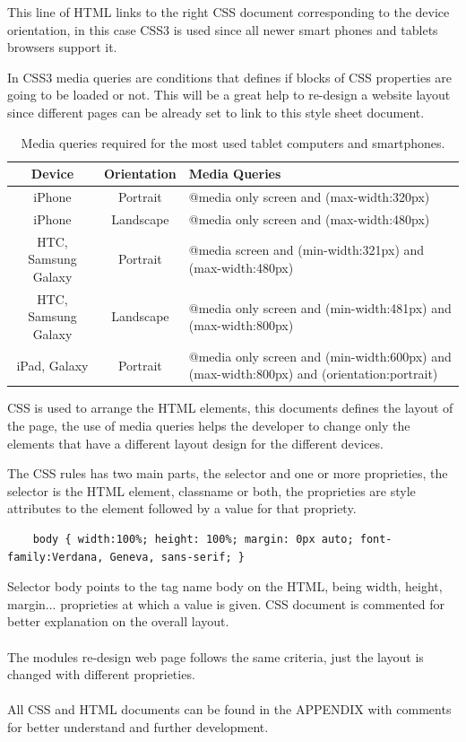 This line of HTML links to the right CSS document corresponding to the device orientation, in this case CSS3 is used since all newer smart phones and tablets browsers support it.

In CSS3 media queries are conditions that defines if blocks of CSS properties are going to be loaded or not. This will be a great help to re-design a website layout since different pages can be already set to link to this style sheet document. \\
\begin{table}[!h]
	\begin{tabular}{| c | c | p{10.5cm} |}
	\hline
	\textbf{Device} & \textbf{Orientation} & \textbf{Media Queries} \\ \hline
	iPhone & Portrait & @media only screen and (max-width:320px)\\ \hline
	iPhone & Landscape & @media only screen and (max-width:480px)\\ \hline
	HTC, Samsung Galaxy & Portrait & @media screen and (min-width:321px) and (max-width:480px)\\ \hline
	HTC, Samsung Galaxy & Landscape & @media only screen and (min-width:481px) and (max-width:800px)\\ \hline
	iPad, Galaxy & Portrait & @media only screen and (min-width:600px) and (max-width:800px) and (orientation:portrait)\\ \hline
	\end{tabular}
	\caption{Media queries required for the most used tablet computers and smartphones.}
\end{table}

CSS is used to arrange the HTML elements, this documents defines the layout of the page, the use of media queries helps the developer to change only the elements that have a different layout design for the different devices.

The CSS rules has two main parts, the selector and one or more proprieties, the selector is the HTML element, classname or both, the proprieties are style attributes to the element followed by a value for that propriety.

\begin{lstlisting}
	body { width:100%; height: 100%; margin: 0px auto; font-family:Verdana, Geneva, sans-serif; }
\end{lstlisting}

Selector body points to the tag name body on the HTML, being width, height, margin... proprieties at which a value is given.
CSS document is commented for better explanation on the overall layout. 
\\
\\The modules re-design web page follows the same criteria, just the layout is changed with different proprieties.
\\
\\All CSS and HTML documents can be found in the APPENDIX with comments for better understand and further development.
